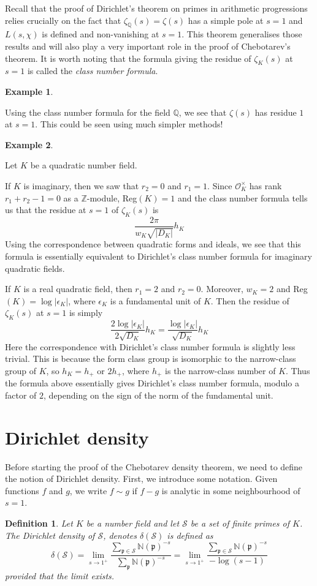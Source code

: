 \documentclass[]{amsart}
\newtheorem{defn}{Definition}
\newtheorem{ex}{Example}
\newcommand{\Z}{\mathbb{Z}}
\newcommand{\Q}{\mathbb{Q}}
\renewcommand{\S}{\mathcal{S}}
\newcommand{\dS}{\delta(\mathcal{S})}
\newcommand{\OK}{\mathcal{O}_K}
\newcommand{\N}{\mathbb{N}}
\newcommand{\p}{\mathfrak{p}}
\begin{document}
		Recall that the proof of Dirichlet's theorem on primes in arithmetic progressions relies crucially on the fact that $\zeta_\Q(s)=\zeta(s)$ has a simple pole at $s=1$ and $L(s,\chi)$ is defined and non-vanishing at $s=1$. This theorem generalises those results and will also play a very important role in  the proof of Chebotarev's theorem. It is worth noting that the formula giving the residue of $\zeta_K(s)$ at $s=1$ is called the \emph{class number formula}. 
	
		\begin{ex}\end{ex} Using the class number formula for the field $\Q$, we see that $\zeta(s)$ has residue $1$ at $s=1$. This could be seen using much simpler methods!
		
		\begin{ex}\end{ex} Let $K$ be a quadratic number field. 
		
		If $K$ is imaginary, then we saw that $r_2=0$ and $r_1=1$. Since $\OK^\times$ has rank $r_1+r_2-1=0$ as a $\Z$-module, Reg$(K)=1$ and the class number formula tells us that the residue at $s=1$ of $\zeta_K(s)$ is
		\[\frac{2\pi}{w_K\sqrt{|D_K|}}h_K\]
		Using the correspondence between quadratic forms and ideals, we see that this formula is essentially equivalent to Dirichlet's class number formula for imaginary quadratic fields.
		
		If $K$ is a real quadratic field, then $r_1=2$ and $r_2=0$. Moreover, $w_K=2$ and Reg$(K)=\log|\epsilon_K|$, where $\epsilon_K$ is a fundamental unit of $K$. Then the residue of $\zeta_K(s)$ at $s=1$ is simply
		\[\frac{2\log|\epsilon_K|}{2\sqrt{D_K}}h_K=\frac{\log|\epsilon_K|}{\sqrt{D_K}}h_K\]
		Here the correspondence with Dirichlet's class number formula is slightly less trivial. This is because the form class group is isomorphic to the narrow-class group of $K$, so $h_K=h_+$ or $2h_+$, where $h_+$ is the narrow-class number of $K$. Thus the formula above essentially gives Dirichlet's class number formula, modulo a factor of $2$, depending on the sign of the norm of the fundamental unit.
		
		\section{Dirichlet density}
			Before starting the proof of the Chebotarev density theorem, we need to define the notion of Dirichlet density. First, we introduce some notation. Given functions $f$ and $g$, we write $f\sim g$ if $f-g$ is analytic in some neighbourhood of $s=1$. 
			\begin{defn}
				Let $K$ be a number field and let $\mathcal{S}$ be a set of finite primes of $K$. The Dirichlet density of $\S$, denotes $\delta(\S)$ is defined as
				\[\dS=\lim_{s\rightarrow 1^+}\frac{\sum_{\p\in\S}\N(\p)^{-s}}{\sum_{\p}\N(\p)^{-s}}=\lim_{s\rightarrow 1^+}\frac{\sum_{\p\in\S}\N(\p)^{-s}}{-\log(s-1)}\]
				provided that the limit exists.
			\end{defn}
			
\end{document}

